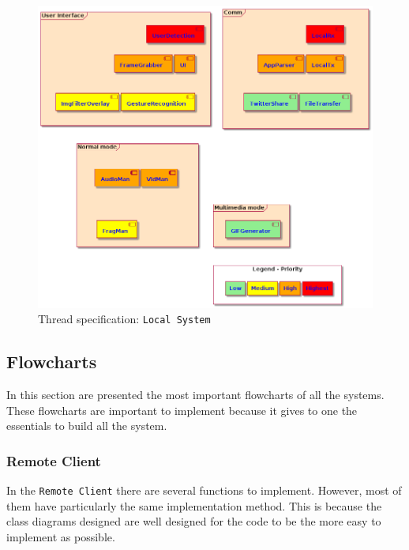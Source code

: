%
\begin{figure}[htb!]
\centering
    \includegraphics[width=0.8\columnwidth]{./img/thread-spec-local.png}
  \caption{Thread specification: \texttt{Local System}}%
\label{fig:thread-spec-local}
\end{figure}
%

\subsection{Flowcharts}
\label{sec:flowcharts}

In this section are presented the most important flowcharts of all the systems. 
These flowcharts are important to implement because it gives to one the essentials to build all the system.

\subsubsection{Remote Client}

In the \texttt{Remote Client} there are several functions to implement.
However, most of them have particularly the same implementation method.
This is because the class diagrams designed are well designed for the code to be the more easy to implement as possible.

